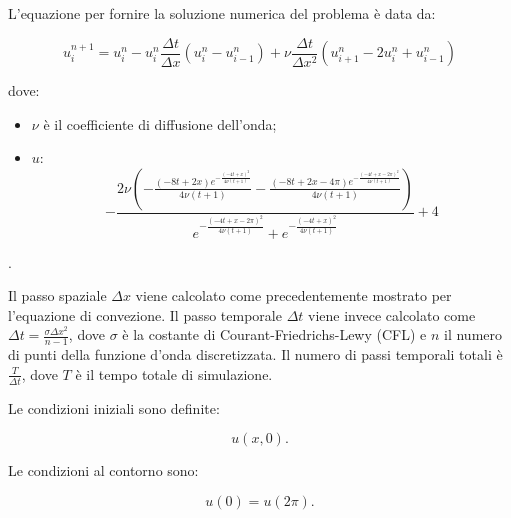 \noindent
L’equazione per fornire la soluzione numerica del problema è data da: 

\begin{equation}
u_i^{n+1} = u_i^n - u_i^n \frac{\Delta t}{\Delta x} (u_i^n - u_{i-1}^n) + \nu \frac{\Delta t}{\Delta x^2}(u_{i+1}^n - 2u_i^n + u_{i-1}^n)
\end{equation}

\noindent
dove: 
\begin{itemize}
\item $\nu$ è il coefficiente di diffusione dell'onda;
\item $u$:
\begin{equation} 
- \frac{2\nu\left(-\frac{(-8t + 2x) e^{-\frac{(-4t + x)^2}{4\nu(t + 1)}}}{4\nu(t + 1)} - \frac{(-8t + 2x - 4\pi) e^{-\frac{(-4t + x - 2\pi)^2}{4\nu(t + 1)}}}{4\nu(t + 1)} \right)}{e^{-\frac{(-4t + x - 2\pi)^2}{4\nu(t + 1)}} + e^{-\frac{(-4t + x)^2}{4\nu(t + 1)}}} + 4 
\end{equation}
\end{itemize}
.


\noindent
Il passo spaziale $\Delta x$ viene calcolato come precedentemente mostrato per l'equazione di convezione. Il passo temporale $\Delta t$ viene invece calcolato come $\Delta t = \frac{\sigma\Delta x^2}{n - 1}$, dove $\sigma$ è la
costante di Courant-Friedrichs-Lewy (CFL) e $n$ il numero di punti della funzione d'onda discretizzata. Il numero di passi temporali totali è $\frac{T}{\Delta t}$, dove $T$ è il tempo totale di simulazione.

\noindent
Le condizioni iniziali sono definite:

\begin{equation}
u(x, 0).
\end{equation}

\noindent
Le condizioni al contorno sono: 

\begin{equation}
u(0) = u(2\pi).
\end{equation}


